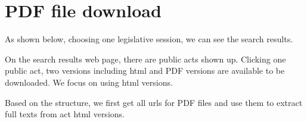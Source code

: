 \documentclass[letterpaper,10pt,english]{jupyterBook}
\begin{document}
\section{PDF file download}
\label{\detokenize{ch25:pdf-file-download}}
\sphinxAtStartPar
As shown below, choosing one legislative session, we can see the search results. 

\sphinxAtStartPar
On the search results web page, there are public acts shown up. Clicking one public act, two versions including html and PDF versions are available to be downloaded. We focus on using html versions.

\sphinxAtStartPar
{}

\sphinxAtStartPar
Based on the structure, we first get all urls for PDF files and use them to extract full texts from act html versions.
\end{document}

